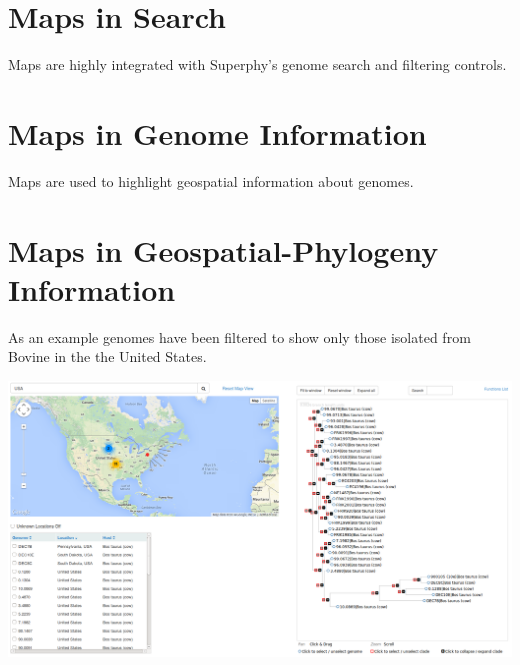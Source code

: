 \documentclass[12pt]{article}
\begin{document}
\section{Maps in Search}

Maps are highly integrated with Superphy's genome search and filtering controls.

\section{Maps in Genome Information}

Maps are used to highlight geospatial information about genomes.

\section{Maps in Geospatial-Phylogeny Information}

As an example genomes have been filtered to show only those isolated from Bovine in the the United States.

\pagebreak

\begin{landscape}
\includegraphics[scale=0.33]{../manuscript_images/geophy.png}
\end{landscape}
\end{document}
